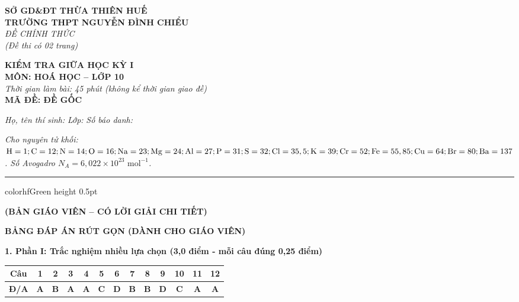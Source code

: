 \documentclass[11pt,a4paper]{article}
\begin{document}
\begin{minipage}[t]{0.48\textwidth}
\textbf{SỞ GD\&ĐT THỪA THIÊN HUẾ}\\
\textbf{TRƯỜNG THPT NGUYỄN ĐÌNH CHIỂU}\\
\textit{ĐỀ CHÍNH THỨC}\\
\textit{(Đề thi có 02 trang)}
\end{minipage}
\hfill
\begin{minipage}[t]{0.48\textwidth}
\raggedleft
\textbf{\color{hfRed}KIỂM TRA GIỮA HỌC KỲ I}\\
\textbf{MÔN: HOÁ HỌC -- LỚP 10}\\
\textit{Thời gian làm bài: 45 phút (không kể thời gian giao đề)}\\
\textbf{MÃ ĐỀ: ĐỀ GỐC}
\end{minipage}

\vspace{4pt}
\noindent
\textit{Họ, tên thí sinh:} \dotfill \textit{Lớp:} \dotfill \textit{Số báo danh:} \dotfill

\vspace{3pt}
\noindent
\textit{\footnotesize Cho nguyên tử khối: $\ce{H} = 1; \ce{C} = 12; \ce{N} = 14; \ce{O} = 16; \ce{Na} = 23; \ce{Mg} = 24; \ce{Al} = 27; \ce{P} = 31; \ce{S} = 32; \ce{Cl} = 35,5; \ce{K} = 39; \ce{Cr} = 52; \ce{Fe} = 55,85; \ce{Cu} = 64; \ce{Br} = 80; \ce{Ba} = 137$. Số Avogadro $N_A = 6,022 \times 10^{23}\text{ mol}^{-1}$.}

\vspace{3pt}
\hrule color{hfGreen} height 0.5pt

\vspace{4pt}
\begin{center}
\textbf{\color{hfRed}\large (BẢN GIÁO VIÊN -- CÓ LỜI GIẢI CHI TIẾT)}
\end{center}

\vspace{2pt}
\begin{center}
{\color{hfRed}\textbf{\large BẢNG ĐÁP ÁN RÚT GỌN (DÀNH CHO GIÁO VIÊN)}}
\end{center}

\vspace{2pt}
\noindent
\textbf{\color{mainGreen}1. Phần I: Trắc nghiệm nhiều lựa chọn (3,0 điểm - mỗi câu đúng 0,25 điểm)}
\begin{center}
\renewcommand{\arraystretch}{1.2}
\begin{tabular}{|c|c|c|c|c|c|c|c|c|c|c|c|c|}
\hline
\rowcolor{tableGreen}
\textbf{Câu} & \textbf{1} & \textbf{2} & \textbf{3} & \textbf{4} & \textbf{5} & \textbf{6} & \textbf{7} & \textbf{8} & \textbf{9} & \textbf{10} & \textbf{11} & \textbf{12} \\
\hline
\textbf{Đ/A} & \textbf{\color{hfRed}A} & \textbf{\color{hfRed}B} & \textbf{\color{hfRed}A} & \textbf{\color{hfRed}A} & \textbf{\color{hfRed}C} & \textbf{\color{hfRed}D} & \textbf{\color{hfRed}B} & \textbf{\color{hfRed}B} & \textbf{\color{hfRed}D} & \textbf{\color{hfRed}C} & \textbf{\color{hfRed}A} & \textbf{\color{hfRed}A} \\
\hline
\end{tabular}
\end{center}
\end{document}
